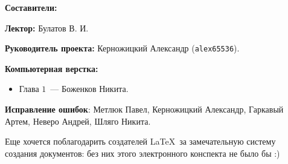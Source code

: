 \documentclass[../main.tex]{subfiles}
\begin{document}
{\Huge \bf Составители:}

\vspace{2em}

{
    \textbf{Лектор:} Булатов В. И.
    
    \smallskip
    
    \textbf{Руководитель проекта:} Керножицкий Александр 
    (\texttt{alex65536}).
    
    \smallskip
    
    \textbf{Компьютерная верстка:}
    \begin{itemize}
     \item Глава $1$~--- Боженков Никита.
    \end{itemize}
    
    \textbf{Исправление ошибок}: Метлюк Павел, Керножицкий Александр, Гаркавый
    Артем, Неверо Андрей, Шляго Никита.
    
    
    \smallskip
    
    Еще хочется поблагодарить создателей \LaTeX\ за замечательную 
    систему создания документов: без них этого электронного 
    конспекта не было бы :)
}

\pagebreak
\end{document}
